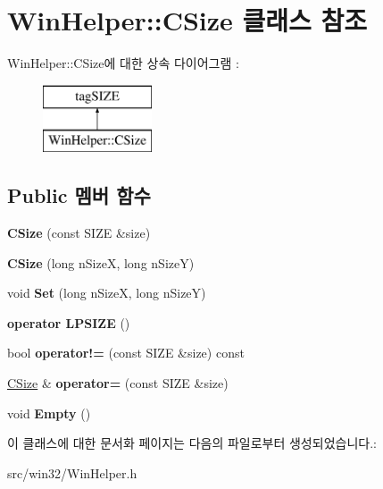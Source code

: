 \hypertarget{class_win_helper_1_1_c_size}{}\section{Win\+Helper\+:\+:C\+Size 클래스 참조}
\label{class_win_helper_1_1_c_size}
Win\+Helper\+:\+:C\+Size에 대한 상속 다이어그램 \+: \begin{figure}[H]
\begin{center}
\leavevmode
\includegraphics[height=2.000000cm]{class_win_helper_1_1_c_size}
\end{center}
\end{figure}
\subsection*{Public 멤버 함수}
\begin{DoxyCompactItemize}
\item 
\mbox{\label{class_win_helper_1_1_c_size_a1029bcc5ddd408e57f98841d286396f9}} 
{\bfseries C\+Size} (const S\+I\+ZE \&size)
\item 
\mbox{\label{class_win_helper_1_1_c_size_a69f59e4395efcfabd5ab7b6c3f212fce}} 
{\bfseries C\+Size} (long n\+SizeX, long n\+SizeY)
\item 
\mbox{\label{class_win_helper_1_1_c_size_a05bf66bfb3fdc5d19da8630983640e5c}} 
void {\bfseries Set} (long n\+SizeX, long n\+SizeY)
\item 
\mbox{\label{class_win_helper_1_1_c_size_a44e73f4780871e2980e00c9666de3fb9}} 
{\bfseries operator L\+P\+S\+I\+ZE} ()
\item 
\mbox{\label{class_win_helper_1_1_c_size_a745dfa0f95195b3120b6aba2f2346d93}} 
bool {\bfseries operator!=} (const S\+I\+ZE \&size) const
\item 
\mbox{\label{class_win_helper_1_1_c_size_a16db5b403ae9c1b8aaff262dba25c5aa}} 
\mbox{\hyperlink{class_win_helper_1_1_c_size}{C\+Size}} \& {\bfseries operator=} (const S\+I\+ZE \&size)
\item 
\mbox{\label{class_win_helper_1_1_c_size_a8ee92c406fa48d19ceaf5709d372126c}} 
void {\bfseries Empty} ()
\end{DoxyCompactItemize}


이 클래스에 대한 문서화 페이지는 다음의 파일로부터 생성되었습니다.\+:\begin{DoxyCompactItemize}
\item 
src/win32/Win\+Helper.\+h\end{DoxyCompactItemize}
